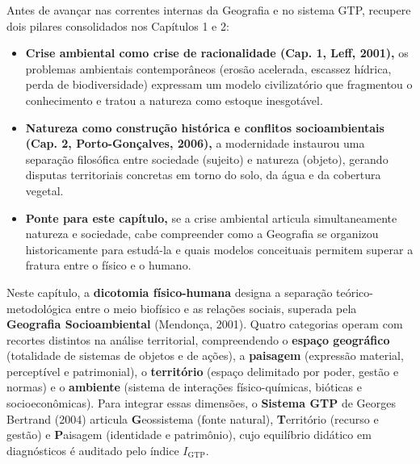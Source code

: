 \begin{capRevisao}
Antes de avançar nas correntes internas da Geografia e no sistema GTP, recupere dois pilares consolidados nos Capítulos 1 e 2:
\begin{itemize}[leftmargin=1.5em, itemsep=2.5pt]
  \item \textbf{Crise ambiental como crise de racionalidade (Cap. 1, Leff, 2001),} os problemas ambientais contemporâneos (erosão acelerada, escassez hídrica, perda de biodiversidade) expressam um modelo civilizatório que fragmentou o conhecimento e tratou a natureza como estoque inesgotável.
  \item \textbf{Natureza como construção histórica e conflitos socioambientais (Cap. 2, Porto-Gonçalves, 2006),} a modernidade instaurou uma separação filosófica entre sociedade (sujeito) e natureza (objeto), gerando disputas territoriais concretas em torno do solo, da água e da cobertura vegetal.
  \item \textbf{Ponte para este capítulo,} se a crise ambiental articula simultaneamente natureza e sociedade, cabe compreender como a Geografia se organizou historicamente para estudá-la e quais modelos conceituais permitem superar a fratura entre o físico e o humano.
\end{itemize}
\end{capRevisao}


\begin{boxSimbolo}
Neste capítulo, a \textbf{dicotomia físico-humana} designa a separação teórico-metodológica entre o meio biofísico e as relações sociais, superada pela \textbf{Geografia Socioambiental} (Mendonça, 2001). Quatro categorias operam com recortes distintos na análise territorial, compreendendo o \textbf{espaço geográfico} (totalidade de sistemas de objetos e de ações), a \textbf{paisagem} (expressão material, perceptível e patrimonial), o \textbf{território} (espaço delimitado por poder, gestão e normas) e o \textbf{ambiente} (sistema de interações físico-químicas, bióticas e socioeconômicas). Para integrar essas dimensões, o \textbf{Sistema GTP} de Georges Bertrand (2004) articula \textbf{G}eossistema (fonte natural), \textbf{T}erritório (recurso e gestão) e \textbf{P}aisagem (identidade e patrimônio), cujo equilíbrio didático em diagnósticos é auditado pelo índice $I_{\text{GTP}}$.
\end{boxSimbolo}

